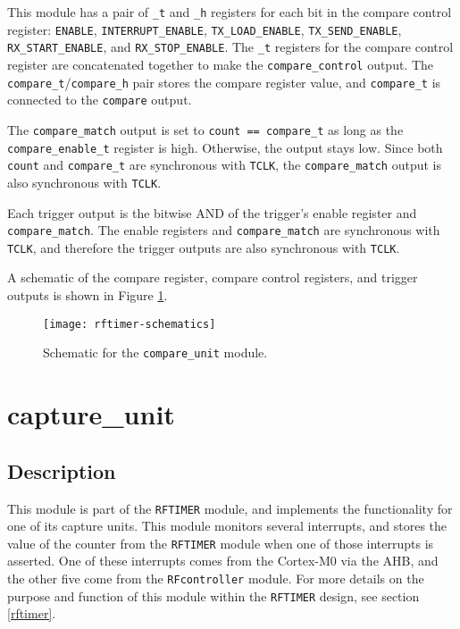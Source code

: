 This module has a pair of \texttt{\_t} and \texttt{\_h} registers for each bit in the compare control register: \texttt{ENABLE}, \texttt{INTERRUPT\_ENABLE}, \texttt{TX\_LOAD\_ENABLE}, \texttt{TX\_SEND\_ENABLE}, \texttt{RX\_START\_ENABLE}, and \texttt{RX\_STOP\_ENABLE}. The \texttt{\_t} registers for the compare control register are concatenated together to make the \texttt{compare\_control} output. The \texttt{compare\_t}/\texttt{compare\_h} pair stores the compare register value, and \texttt{compare\_t} is connected to the \texttt{compare} output.

The \texttt{compare\_match} output is set to \texttt{count == compare\_t} as long as the \texttt{compare\-\_enable\_t} register is high. Otherwise, the output stays low. Since both \texttt{count} and \texttt{compare\_t} are synchronous with \texttt{TCLK}, the \texttt{compare\_match} output is also synchronous with \texttt{TCLK}.

Each trigger output is the bitwise AND of the trigger's enable register and \texttt{compare\_match}. The enable registers and \texttt{compare\_match} are synchronous with \texttt{TCLK}, and therefore the trigger outputs are also synchronous with \texttt{TCLK}.

A schematic of the compare register, compare control registers, and trigger outputs is shown in Figure \ref{fig:compare-unit}.

\begin{figure}
	\centering
	\texttt{[image: rftimer-schematics]}
	\caption{Schematic for the \texttt{compare\_unit} module.}
	\label{fig:compare-unit}
\end{figure}

\section{capture\_unit} \label{capture-unit}
\subsection{Description}
This module is part of the \texttt{RFTIMER} module, and implements the functionality for one of its capture units. This module monitors several interrupts, and stores the value of the counter from the \texttt{RFTIMER} module when one of those interrupts is asserted. One of these interrupts comes from the Cortex-M0 via the AHB, and the other five come from the \texttt{RFcontroller} module. For more details on the purpose and function of this module within the \texttt{RFTIMER} design, see section \ref{rftimer}.

